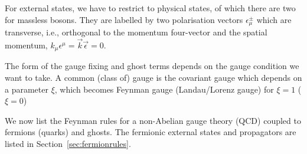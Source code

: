 \documentclass[12pt]{report}
\newcommand{\2}{\ensuremath{\sqrt{2}\,}}
\begin{document}
{      For external states, we have to restrict to physical states, of which there are two for
      massless bosons. They are labelled by two polarisation vectors
      $\epsilon^\pm_\mu$ which are
      transverse, i.e., orthogonal to the momentum four-vector and the spatial momentum,
      \mbox{$k_\mu \epsilon^\mu=\vec{k}\vec{\epsilon}=0$}.
      
      The form of the gauge fixing and ghost terms depends on the gauge condition we want to
      take. A common (class of) gauge is the covariant gauge which depends on a parameter $\xi$,
      which becomes Feynman gauge (Landau/Lorenz gauge) for $\xi=1$ ($\xi=0$)%
      
      We now list the Feynman rules for a non-Abelian gauge theory (QCD) coupled to fermions
      (quarks) and ghosts. The fermionic external states and propagators are listed in
      Section~\ref{sec:fermionrules}. 
        
}
\end{document}
